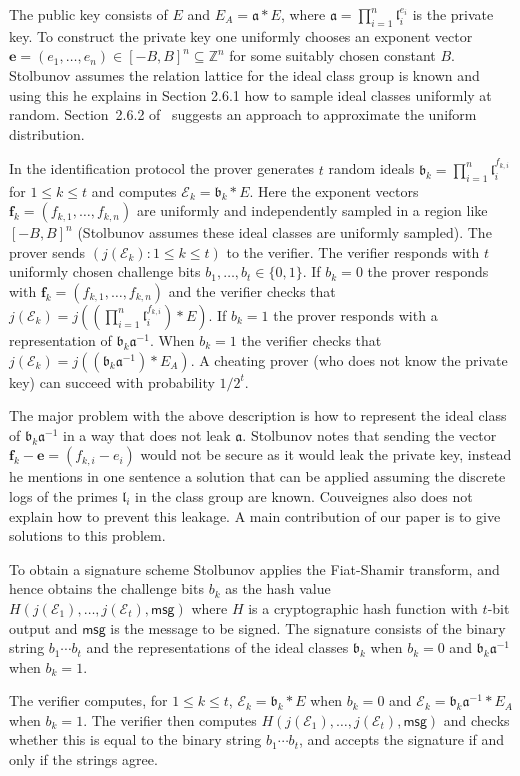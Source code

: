 \documentclass{llncs}
\newcommand{\E}{\mathcal{E}}
\newcommand{\Z}{\mathbb{Z}}
\newcommand{\msg}{\mathsf{msg}}
\renewcommand{\a}{\mathfrak{a}}
\renewcommand{\b}{\mathfrak{b}}
\renewcommand{\l}{\mathfrak{l}}
\newcommand{\e}{\mathbf{e}}
\newcommand{\f}{\mathbf{f}}
\begin{document}
The public key consists of $E$ and $E_A = \a * E$, where $\a = \prod_{i=1}^n \l_i^{e_i}$ is the private key.
To construct the private key one uniformly chooses an exponent vector $\e = (e_1, \dots, e_n) \in [-B,B]^n \subseteq \Z^n$ for some suitably chosen constant $B$.
Stolbunov assumes the relation lattice for the ideal class group is known and using this he explains in Section 2.6.1 how to sample ideal classes uniformly at random.
Section~2.6.2 of~\cite{Sto12} suggests an approach to approximate the uniform distribution.

In the identification protocol the prover generates $t$ random ideals $\b_k = \prod_{i=1}^n \l_i^{f_{k,i}}$ for $1 \le k \le t$ and computes $\E_k = \b_k * E$.
Here the exponent vectors $\f_k = ( f_{k,1}, \dots, f_{k,n} )$ are uniformly and independently sampled in a region like $[-B,B]^n$ (Stolbunov assumes these ideal classes are uniformly sampled).
The prover sends $(j( \E_k ) : 1 \le k \le t )$ to the verifier.
The verifier responds with $t$ uniformly chosen challenge bits $b_1, \dots, b_t \in \{0,1\}$.
If $b_k = 0$ the prover responds with $\f_k = ( f_{k,1}, \dots, f_{k,n} )$ and the verifier checks that $j(\E_k) = j( (\prod_{i=1}^n \l_i^{f_{k,i}}) * E )$.
If $b_k = 1$ the prover responds with a representation of $\b_k \a^{-1}$.
When $b_k=1$ the verifier checks that $j(\E_k) = j( (\b_k \a^{-1}) * E_A )$.
A cheating prover (who does not know the private key) can succeed with probability $1/2^t$.

The major problem with the above description is how to represent the ideal class of $\b_k \a^{-1}$ in a way that does not leak $\a$.
Stolbunov notes that sending the vector $\f_k - \e = (f_{k,i} - e_i )$ would not be secure as it would leak the private key, instead he mentions in one sentence a solution that can be applied assuming the discrete logs of the primes $\l_i$ in the class group are known.
Couveignes also does not explain how to prevent this leakage.
A main contribution of our paper is to give solutions to this problem.

To obtain a signature scheme Stolbunov applies the Fiat-Shamir transform, and hence obtains the challenge bits $b_k$ as the hash value $H( j(\E_1), \dots, j(\E_t) , \msg )$ where $H$ is a cryptographic hash function with $t$-bit output and $\msg$ is the message to be signed.
The signature consists of the binary string $b_1\cdots b_t$ and the representations of the ideal classes $\b_k$ when $b_k = 0$ and $\b_k \a^{-1}$ when $b_k = 1$.

The verifier computes, for $1 \le k \le t$, $\E_k = \b_k * E$ when $b_k = 0$ and $\E_k = \b_k \a^{-1} * E_A$ when $b_k = 1$. The verifier then computes $H( j( \E_1), \dots, j(\E_t), \msg )$ and checks whether this is equal to the binary string $b_1\cdots b_t$, and accepts the signature if and only if the strings agree.
\end{document}
